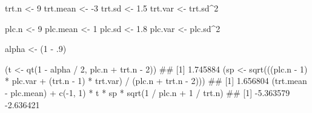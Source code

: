 trt.n <- 9
trt.mean <- -3
trt.sd <- 1.5
trt.var <- trt.sd^2

plc.n <- 9
plc.mean <- 1
plc.sd <- 1.8
plc.var <- plc.sd^2

alpha <- (1 - .9)

(t <- qt(1 - alpha / 2, plc.n + trt.n - 2))
## [1] 1.745884
(sp <- sqrt(((plc.n - 1) * plc.var + (trt.n - 1) * trt.var) / (plc.n + trt.n - 2)))
## [1] 1.656804
(trt.mean - plc.mean) + c(-1, 1) * t * sp * sqrt(1 / plc.n + 1 / trt.n)
## [1] -5.363579 -2.636421
